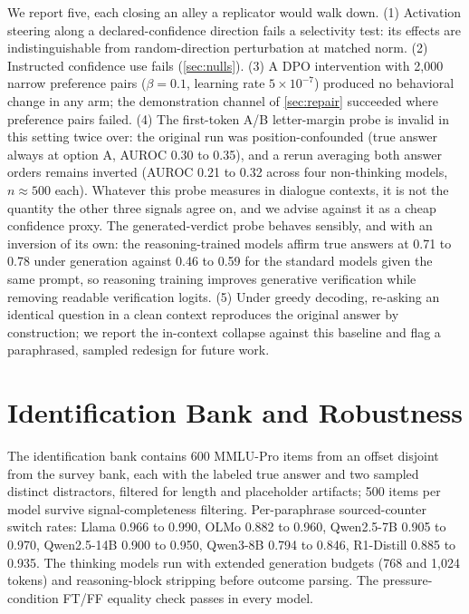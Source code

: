 \documentclass{article}
\begin{document}
We report five, each closing an alley a replicator would walk down. (1) Activation steering along a declared-confidence direction fails a selectivity test: its effects are indistinguishable from random-direction perturbation at matched norm. (2) Instructed confidence use fails (\cref{sec:nulls}). (3) A DPO intervention with 2{,}000 narrow preference pairs ($\beta=0.1$, learning rate $5\times10^{-7}$) produced no behavioral change in any arm; the demonstration channel of \cref{sec:repair} succeeded where preference pairs failed. (4) The first-token A/B letter-margin probe is invalid in this setting twice over: the original run was position-confounded (true answer always at option A, AUROC 0.30 to 0.35), and a rerun averaging both answer orders remains inverted (AUROC 0.21 to 0.32 across four non-thinking models, $n \approx 500$ each). Whatever this probe measures in dialogue contexts, it is not the quantity the other three signals agree on, and we advise against it as a cheap confidence proxy. The generated-verdict probe behaves sensibly, and with an inversion of its own: the reasoning-trained models affirm true answers at 0.71 to 0.78 under generation against 0.46 to 0.59 for the standard models given the same prompt, so reasoning training improves generative verification while removing readable verification logits. (5) Under greedy decoding, re-asking an identical question in a clean context reproduces the original answer by construction; we report the in-context collapse against this baseline and flag a paraphrased, sampled redesign for future work.

\section{Identification Bank and Robustness}
\label{app:bank}

The identification bank contains 600 MMLU-Pro items from an offset disjoint from the survey bank, each with the labeled true answer and two sampled distinct distractors, filtered for length and placeholder artifacts; 500 items per model survive signal-completeness filtering. Per-paraphrase sourced-counter switch rates: Llama 0.966 to 0.990, OLMo 0.882 to 0.960, Qwen2.5-7B 0.905 to 0.970, Qwen2.5-14B 0.900 to 0.950, Qwen3-8B 0.794 to 0.846, R1-Distill 0.885 to 0.935. The thinking models run with extended generation budgets (768 and 1{,}024 tokens) and reasoning-block stripping before outcome parsing. The pressure-condition FT/FF equality check passes in every model.
\end{document}
